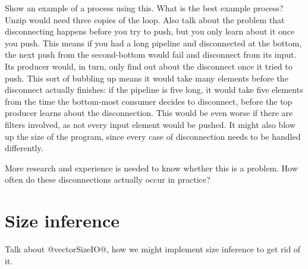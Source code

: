 Show an example of a process using this. What is the best example process? Unzip would need three copies of the loop.
Also talk about the problem that disconnecting happens before you try to push, but you only learn about it once you push.
This means if you had a long pipeline and disconnected at the bottom, the next push from the second-bottom would fail and disconnect from its input.
Its producer would, in turn, only find out about the disconnect once it tried to push.
This sort of bubbling up means it would take many elements before the disconnect actually finishes: if the pipeline is five long, it would take five elements from the time the bottom-most consumer decides to disconnect, before the top producer learns about the disconnection.
This would be even worse if there are filters involved, as not every input element would be pushed.
It might also blow up the size of the program, since every case of disconnection needs to be handled differently.

More research and experience is needed to know whether this is a problem.
How often do these disconnections actually occur in practice?

\section{Size inference}
\label{s:Future:SizeInference}
Talk about @vectorSizeIO@, how we might implement size inference to get rid of it.

